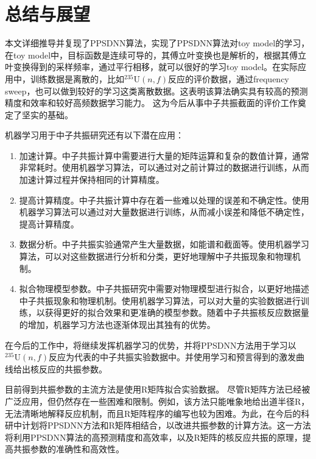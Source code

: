 \chapter{总结与展望}\label{chap4}

本文详细推导并复现了PPSDNN算法，实现了PPSDNN算法对toy model的学习，在toy model中，目标函数是连续可导的，其傅立叶变换也是解析的，根据其傅立叶变换得到的采样频率，通过平行相移，就可以很好的学习toy model。在实际应用中，训练数据是离散的，比如$^{235}\text{U}(n,f)$反应的评价数据，通过frequency sweep，也可以做到较好的学习这类离散数据。这表明该算法确实具有较高的预测精度和效率和较好高频数据学习能力。
这为今后从事中子共振截面的评价工作奠定了坚实的基础。

机器学习用于中子共振研究还有以下潜在应用：
\begin{enumerate}
    \item 加速计算\cite{verbraeken2020survey}。中子共振计算中需要进行大量的矩阵运算和复杂的数值计算，通常非常耗时。使用机器学习算法，可以通过对之前计算过的数据进行训练，从而加速计算过程并保持相同的计算精度。
    \item 提高计算精度。中子共振计算中存在着一些难以处理的误差和不确定性。使用机器学习算法可以通过对大量数据进行训练，从而减小误差和降低不确定性，提高计算精度。
    \item 数据分析。中子共振实验通常产生大量数据，如能谱和截面等。使用机器学习算法，可以对这些数据进行分析和分类，更好地理解中子共振现象和物理机制。
    \item 拟合物理模型参数。中子共振研究中需要对物理模型进行拟合，以更好地描述中子共振现象和物理机制。使用机器学习算法，可以对大量的实验数据进行训练，以获得更好的拟合效果和更准确的模型参数。随着中子共振核反应数据量的增加，机器学习方法也逐渐体现出其独有的优势。
\end{enumerate}

在今后的工作中，将继续发挥机器学习的优势，并将PPSDNN方法用于学习以$^{235}\text{U}(n,f)$反应为代表的中子共振实验数据中。并使用学习和预言得到的激发曲线给出核反应的共振参数。

目前得到共振参数的主流方法是使用R矩阵拟合实验数据。
尽管R矩阵方法已经被广泛应用，但仍然存在一些困难和限制。例如，该方法只能唯象地给出道半径R，无法清晰地解释反应机制，而且R矩阵程序的编写也较为困难。为此，在今后的科研中计划将PPSDNN方法和R矩阵相结合，以改进共振参数的计算方法。这一方法将利用PPSDNN算法的高预测精度和高效率，以及R矩阵的核反应共振的原理，提高共振参数的准确性和高效性。